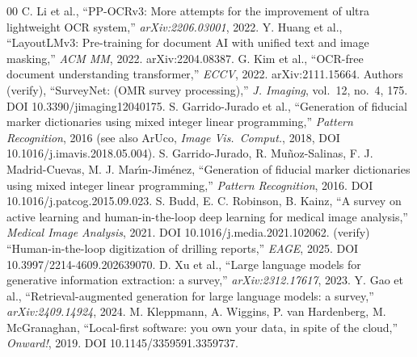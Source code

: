 \documentclass[conference]{IEEEtran}
\begin{document}
\begin{thebibliography}{00}
 C. Li et al., ``PP-OCRv3: More attempts for the improvement of ultra lightweight OCR system,'' \emph{arXiv:2206.03001}, 2022.
 Y. Huang et al., ``LayoutLMv3: Pre-training for document AI with unified text and image masking,'' \emph{ACM MM}, 2022. arXiv:2204.08387.
 G. Kim et al., ``OCR-free document understanding transformer,'' \emph{ECCV}, 2022. arXiv:2111.15664.
 Authors (verify), ``SurveyNet: (OMR survey processing),'' \emph{J. Imaging}, vol.~12, no.~4, 175. DOI 10.3390/jimaging12040175.
 S. Garrido-Jurado et al., ``Generation of fiducial marker dictionaries using mixed integer linear programming,'' \emph{Pattern Recognition}, 2016 (see also ArUco, \emph{Image Vis.\ Comput.}, 2018, DOI 10.1016/j.imavis.2018.05.004).
 S. Garrido-Jurado, R. Mu{\~n}oz-Salinas, F. J. Madrid-Cuevas, M. J. Mar{\'\i}n-Jim{\'e}nez, ``Generation of fiducial marker dictionaries using mixed integer linear programming,'' \emph{Pattern Recognition}, 2016. DOI 10.1016/j.patcog.2015.09.023.
 S. Budd, E. C. Robinson, B. Kainz, ``A survey on active learning and human-in-the-loop deep learning for medical image analysis,'' \emph{Medical Image Analysis}, 2021. DOI 10.1016/j.media.2021.102062.
 (verify) ``Human-in-the-loop digitization of drilling reports,'' \emph{EAGE}, 2025. DOI 10.3997/2214-4609.202639070.
 D. Xu et al., ``Large language models for generative information extraction: a survey,'' \emph{arXiv:2312.17617}, 2023.
 Y. Gao et al., ``Retrieval-augmented generation for large language models: a survey,'' \emph{arXiv:2409.14924}, 2024.
 M. Kleppmann, A. Wiggins, P. van Hardenberg, M. McGranaghan, ``Local-first software: you own your data, in spite of the cloud,'' \emph{Onward!}, 2019. DOI 10.1145/3359591.3359737.
\end{thebibliography}
\end{document}
